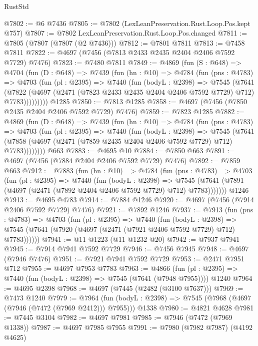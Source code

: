 \begin{lexlean}{RustStd}
\begin{coremodule}
@7802 := @6 @7436
@7805 := @7802 (LexLeanPreservation.Rust.Loop.Pos.kept @757)
@7807 := @7802 LexLeanPreservation.Rust.Loop.Pos.changed
@7811 := @7805 (@7807 (@7807 (@2 @7436)))
@7812 := @7801 @7811
@7813 := @7458 @7811
@7822 := @4697 (@7456 (@7813 @2433 @2435 @2404 @2406 @7592 @7729) @7476)
@7823 := @7480 @7811
@7849 := @4869
    (fun (S : @648) =>
    @4704
      (fun (D : @648) =>
      @7439
        (fun (hn : @10) =>
        @4784
          (fun (pns : @4783) =>
          @4703
            (fun (pl : @2395) =>
            @7440
              (fun (bodyL : @2398) =>
              @7545
                (@7641
                  (@7822
                    (@4697 (@2471 (@7823 @2433 @2435 @2404 @2406 @7592 @7729) @712) @7783)))))))))
    @1285
@7850 := @7813 @1285
@7858 := @4697 (@7456 (@7850 @2435 @2404 @2406 @7592 @7729) @7476)
@7859 := @7823 @1285
@7882 := @4869
    (fun (D : @648) =>
    @7439
      (fun (hn : @10) =>
      @4784
        (fun (pns : @4783) =>
        @4703
          (fun (pl : @2395) =>
          @7440
            (fun (bodyL : @2398) =>
            @7545
              (@7641 (@7858 (@4697 (@2471 (@7859 @2435 @2404 @2406 @7592 @7729) @712) @7783))))))))
    @663
@7883 := @4695 @10
@7884 := @7850 @663
@7891 := @4697 (@7456 (@7884 @2404 @2406 @7592 @7729) @7476)
@7892 := @7859 @663
@7912 := @7883
    (fun (hn : @10) =>
    @4784
      (fun (pns : @4783) =>
      @4703
        (fun (pl : @2395) =>
        @7440
          (fun (bodyL : @2398) =>
          @7545 (@7641 (@7891 (@4697 (@2471 (@7892 @2404 @2406 @7592 @7729) @712) @7783)))))))
    @1246
@7913 := @4695 @4783
@7914 := @7884 @1246
@7920 := @4697 (@7456 (@7914 @2406 @7592 @7729) @7476)
@7921 := @7892 @1246
@7937 := @7913
    (fun (pns : @4783) =>
    @4703
      (fun (pl : @2395) =>
      @7440
        (fun (bodyL : @2398) =>
        @7545 (@7641 (@7920 (@4697 (@2471 (@7921 @2406 @7592 @7729) @712) @7783))))))
@7941 := @11 @1223 (@11 @1232 @20)
@7942 := @7937 @7941
@7945 := @7914 @7941 @7592 @7729
@7946 := @7456 @7945
@7948 := @4697 (@7946 @7476)
@7951 := @7921 @7941 @7592 @7729
@7953 := @2471 @7951 @712
@7955 := @4697 @7953 @7783
@7963 := @4866
    (fun (pl : @2395) => @7440 (fun (bodyL : @2398) => @7545 (@7641 (@7948 @7955))))
    @1240
@7964 := @4695 @2398
@7968 := @4697 (@7445 (@2482 (@3100 @7637)))
@7969 := @7473 @1240
@7979 := @7964
    (fun (bodyL : @2398) => @7545 (@7968 (@4697 (@7946 (@7472 (@7969 @2412))) @7955)))
    @1338
@7980 := @4821 @4628
@7981 := @7445 @3104
@7982 := @4697 @7981
@7985 := @7946 (@7472 (@7969 @1338))
@7987 := @4697 @7985 @7955
@7991 := @7980 (@7982 @7987) (@4192 @4625)

\end{coremodule}
\end{lexlean}
